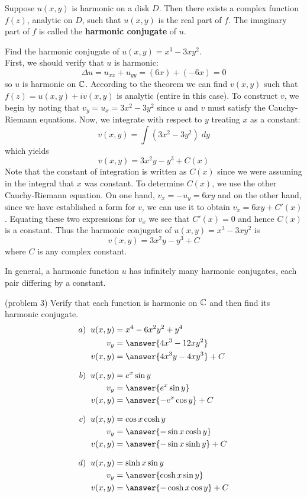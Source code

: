 \documentclass[handout]{ximera}
\begin{document}
  
\begin{theorem}
Suppose $u(x,y)$ is harmonic on a disk $D$.  Then there exists a complex function $f(z)$, analytic on $D$, 
such that $u(x,y)$ is the real part of $f$. The imaginary part of $f$ is called the {\bf harmonic conjugate} of $u$.
\end{theorem}


\begin{example}[example 3]
Find the harmonic conjugate of $u(x,y) = x^3 - 3xy^2$.\\
First, we should verify that $u$ is harmonic:
\[
\Delta u = u_{xx} + u_{yy} = (6x) + (-6x) = 0
\]
so $u$ is harmonic on $\mathbb C$. According to the theorem we can find $v(x,y)$ such that
$f(z) = u(x,y) + iv(x,y)$ is analytic (entire in this case). To construct $v$, we begin by noting that
$v_y = u_x = 3x^2 - 3y^2$ since $u$ and $v$ must satisfy the Cauchy-Riemann equations.
Now, we integrate with respect to $y$ treating $x$ as a constant:
\[
v(x,y) = \int \left(3x^2 -3y^2\right) \; dy
\]
which yields
\[
v(x,y) = 3x^2y - y^3 + C(x)
\]
Note that the constant of integration is written as $C(x)$ since we were assuming in 
the integral that $x$ was constant. To determine $C(x)$, we use the other Cauchy-Riemann equation. 
On one hand, $v_x = -u_y = 6xy$ and on the other hand, since we have established a form for $v$, we can use it
to obtain $v_x = 6xy + C'(x)$. Equating these two expressions for $v_x$ we see 
that $C'(x) =0$ and hence $C(x)$ is a constant. Thus the harmonic conjugate of $u(x,y) = x^3 - 3xy^2$ is
\[
v(x,y) = 3x^2y - y^3 + C
\]
where $C$ is any complex constant.
\end{example}

\begin{remark}
In general, a harmonic function $u$ has infinitely many harmonic conjugates, each pair differing by a constant.
\end{remark}

\begin{problem}(problem 3)
Verify that each function is harmonic on $\mathbb C$ and then find its harmonic conjugate.
\begin{align*}
a) \;\;u(x,y) &= x^4 -6x^2y^2 + y^4\\
v_y &= \answer{4x^3 - 12xy^2}\\
v(x,y) &= \answer{4x^3y - 4xy^3}+C\\[8pt]
b) \;\;u(x,y) &= e^x\sin y\\
v_y &= \answer{e^x \sin y}\\
v(x,y) &= \answer{-e^x \cos y}+C\\[8pt]
c) \;\;u(x,y) &= \cos x \cosh y\\
v_y &= \answer{-\sin x \cosh y}\\
v(x,y) &= \answer{-\sin x \sinh y}+C\\[8pt]
d) \;\; u(x,y) &= \sinh x \sin y\\
v_y &= \answer{\cosh x \sin y}\\
v(x,y) &= \answer{-\cosh x \cos y}+C
\end{align*}
\end{problem}
\end{document}
